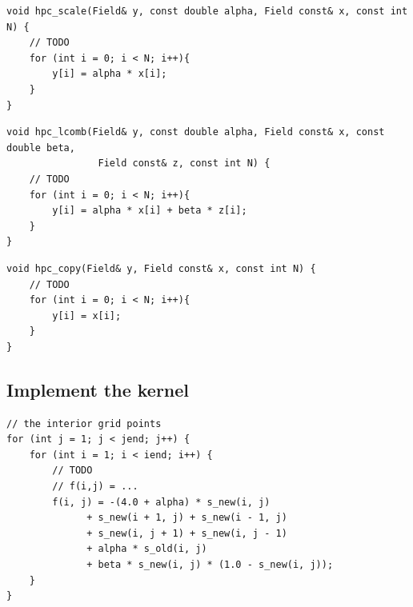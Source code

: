 \documentclass[unicode,11pt,a4paper,oneside,numbers=endperiod,openany]{scrartcl}
\begin{document}
\begin{lstlisting}[language=MyC++, style=mystyle, caption={HPC Scale Function}]
void hpc_scale(Field& y, const double alpha, Field const& x, const int N) {
    // TODO
    for (int i = 0; i < N; i++){
        y[i] = alpha * x[i];
    }
}
\end{lstlisting}
\begin{lstlisting}[language=MyC++, style=mystyle, caption={HPC Linear Combination Function}]
void hpc_lcomb(Field& y, const double alpha, Field const& x, const double beta,
                Field const& z, const int N) {
    // TODO
    for (int i = 0; i < N; i++){
        y[i] = alpha * x[i] + beta * z[i];
    }
}
\end{lstlisting}
\begin{lstlisting}[language=MyC++, style=mystyle, caption={HPC Copy Function}]
void hpc_copy(Field& y, Field const& x, const int N) {
    // TODO
    for (int i = 0; i < N; i++){
        y[i] = x[i];
    }
}
\end{lstlisting}
\subsection{Implement the kernel}  
\begin{lstlisting}[language=MyC++, style=mystyle, caption={Interior Grid Points Calculation}]
// the interior grid points
for (int j = 1; j < jend; j++) {
    for (int i = 1; i < iend; i++) {
        // TODO
        // f(i,j) = ...
        f(i, j) = -(4.0 + alpha) * s_new(i, j)
              + s_new(i + 1, j) + s_new(i - 1, j)
              + s_new(i, j + 1) + s_new(i, j - 1)
              + alpha * s_old(i, j)
              + beta * s_new(i, j) * (1.0 - s_new(i, j));
    }
}
\end{lstlisting}
\end{document}
